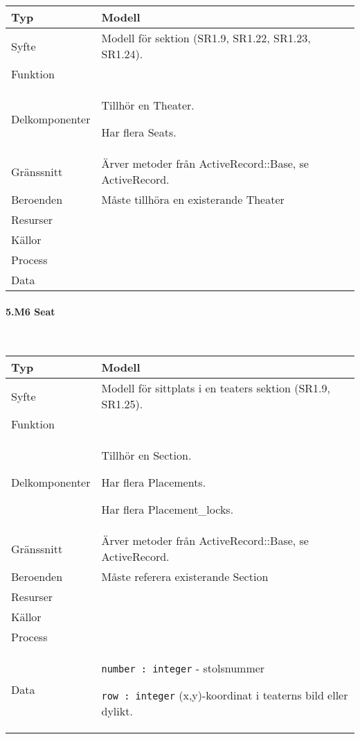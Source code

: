 \documentclass[a4paper, twoside, 11pt, titlepage]{article}
\begin{document}
			\begin {table} [ht] \begin{tabular} {  p{3.5cm} p{9.6cm} }
				\hline
				{Typ} & {Modell} \\
				\hline
				{Syfte} & {Modell för sektion (SR1.9, SR1.22, SR1.23, SR1.24).} \\
				\hline
				{Funktion} & { } \\
				\hline
				{Delkomponenter} & {Tillhör en Theater.

Har flera Seats.} \\
				\hline
				{Gränssnitt} & {Ärver metoder från ActiveRecord::Base, se ActiveRecord.} \\
				\hline
				{Beroenden} & {Måste tillhöra en existerande Theater} \\
				\hline
				{Resurser} & { } \\
				\hline
				{Källor} & { } \\
				\hline
				{Process} & { } \\
				\hline
				{Data} & { } \\
				\hline
			\end{tabular} \end{table} \FloatBarrier


			\paragraph{5.M6 Seat}\

			\begin {table} [ht] \begin{tabular} {  p{3.5cm} p{9.6cm} }
				\hline
				{Typ} & {Modell} \\
				\hline
				{Syfte} & {Modell för sittplats i en teaters sektion (SR1.9, SR1.25).} \\
				\hline
				{Funktion} & { } \\
				\hline
				{Delkomponenter} & {Tillhör en Section.

Har flera Placements.

Har flera Placement\_locks.} \\
				\hline
				{Gränssnitt} & {Ärver metoder från ActiveRecord::Base, se ActiveRecord.} \\
				\hline
				{Beroenden} & {Måste referera existerande Section} \\
				\hline
				{Resurser} & { } \\
				\hline
				{Källor} & { } \\
				\hline
				{Process} & { } \\
				\hline
				{Data} & {{\tt number : integer} - stolsnummer

{\tt row : integer} (x,y)-koordinat i teaterns bild eller dylikt.} \\
				\hline
			\end{tabular} \end{table} \FloatBarrier
\end{document}
